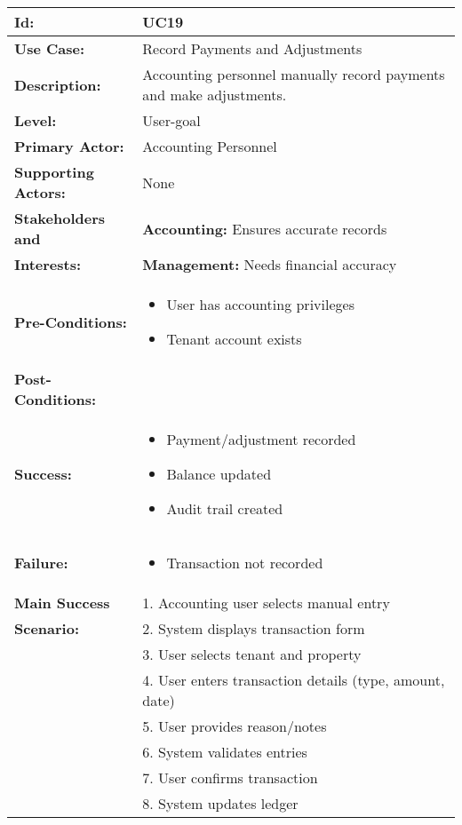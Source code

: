 \documentclass[12pt]{article}
\begin{document}
\begin{tabular}{|p{3cm}|p{11cm}|}
\hline
\textbf{Id:} & UC19 \\
\hline
\textbf{Use Case:} & Record Payments and Adjustments \\
\hline
\textbf{Description:} & Accounting personnel manually record payments and make adjustments. \\
\hline
\textbf{Level:} & User-goal \\
\hline
\textbf{Primary Actor:} & Accounting Personnel \\
\hline
\textbf{Supporting Actors:} & None \\
\hline
\textbf{Stakeholders and} & \textbf{Accounting:} Ensures accurate records \\
\textbf{Interests:} & \textbf{Management:} Needs financial accuracy \\
\hline
\textbf{Pre-Conditions:} & 
\begin{itemize}
    \item User has accounting privileges
    \item Tenant account exists
\end{itemize} \\
\hline
\textbf{Post-Conditions:} & \\
\textbf{Success:} & 
\begin{itemize}
    \item Payment/adjustment recorded
    \item Balance updated
    \item Audit trail created
\end{itemize} \\
\textbf{Failure:} & 
\begin{itemize}
    \item Transaction not recorded
\end{itemize} \\
\hline
\textbf{Main Success} & 1. Accounting user selects manual entry \\
\textbf{Scenario:} & 2. System displays transaction form \\
& 3. User selects tenant and property \\
& 4. User enters transaction details (type, amount, date) \\
& 5. User provides reason/notes \\
& 6. System validates entries \\
& 7. User confirms transaction \\
& 8. System updates ledger \\

\end{tabular}
\end{document}
